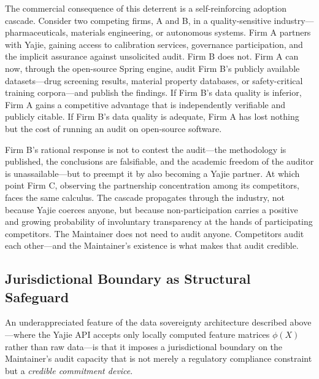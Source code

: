 \documentclass[12pt,a4paper]{ctexart}
\theoremstyle{definition}
\theoremstyle{remark}
\begin{document}
The commercial consequence of this deterrent is a self-reinforcing adoption cascade. Consider two competing firms, A and B, in a quality-sensitive industry—pharmaceuticals, materials engineering, or autonomous systems. Firm A partners with Yajie, gaining access to calibration services, governance participation, and the implicit assurance against unsolicited audit. Firm B does not. Firm A can now, through the open-source Spring engine, audit Firm B's publicly available datasets—drug screening results, material property databases, or safety-critical training corpora—and publish the findings. If Firm B's data quality is inferior, Firm A gains a competitive advantage that is independently verifiable and publicly citable. If Firm B's data quality is adequate, Firm A has lost nothing but the cost of running an audit on open-source software.

Firm B's rational response is not to contest the audit—the methodology is published, the conclusions are falsifiable, and the academic freedom of the auditor is unassailable—but to preempt it by also becoming a Yajie partner. At which point Firm C, observing the partnership concentration among its competitors, faces the same calculus. The cascade propagates through the industry, not because Yajie coerces anyone, but because non-participation carries a positive and growing probability of involuntary transparency at the hands of participating competitors. The Maintainer does not need to audit anyone. Competitors audit each other—and the Maintainer's existence is what makes that audit credible.

\subsection{Jurisdictional Boundary as Structural Safeguard}

An underappreciated feature of the data sovereignty architecture described above—where the Yajie API accepts only locally computed feature matrices $\phi(X)$ rather than raw data—is that it imposes a jurisdictional boundary on the Maintainer's audit capacity that is not merely a regulatory compliance constraint but a \textit{credible commitment device}.
\end{document}
